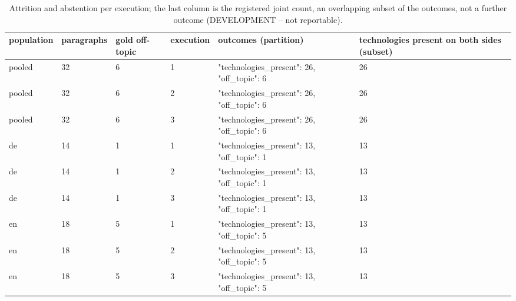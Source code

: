 \begin{table}[htbp]
\centering
\small
\begin{tabular}{llllll}
\toprule
\textbf{population} & \textbf{paragraphs} & \textbf{gold off-topic} & \textbf{execution} & \textbf{outcomes (partition)} & \textbf{technologies present on both sides (subset)} \\
\midrule
pooled & 32 & 6 & 1 & {"technologies\_present": 26, "off\_topic": 6} & 26 \\
pooled & 32 & 6 & 2 & {"technologies\_present": 26, "off\_topic": 6} & 26 \\
pooled & 32 & 6 & 3 & {"technologies\_present": 26, "off\_topic": 6} & 26 \\
de & 14 & 1 & 1 & {"technologies\_present": 13, "off\_topic": 1} & 13 \\
de & 14 & 1 & 2 & {"technologies\_present": 13, "off\_topic": 1} & 13 \\
de & 14 & 1 & 3 & {"technologies\_present": 13, "off\_topic": 1} & 13 \\
en & 18 & 5 & 1 & {"technologies\_present": 13, "off\_topic": 5} & 13 \\
en & 18 & 5 & 2 & {"technologies\_present": 13, "off\_topic": 5} & 13 \\
en & 18 & 5 & 3 & {"technologies\_present": 13, "off\_topic": 5} & 13 \\
\bottomrule
\end{tabular}
\caption{Attrition and abstention per execution; the last column is the registered joint count, an overlapping subset of the outcomes, not a further outcome (DEVELOPMENT -- not reportable).}
\end{table}
